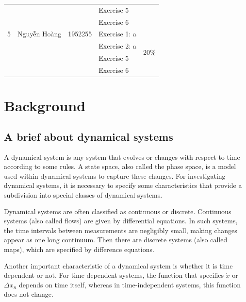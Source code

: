 \documentclass[a4paper]{article}
\numberwithin{equation}{section}
\begin{document}
\begin{center}
\begin{tabular}{llclc}
                 &                       &                     & Exercise 5        &                             \\
                 &                       &                     & Exercise 6        &                             \\
    \midrule
    5            & Nguyễn Hoàng          & 1952255             & Exercise 1: a     & \multirow{4}{*}{20\%}       \\
                 &                       &                     & Exercise 2: a     &                             \\
                 &                       &                     & Exercise 5        &                             \\
                 &                       &                     & Exercise 6        &                             \\
    \bottomrule
  \end{tabular}
\end{center}


\newpage
\section{Background}
\subsection{A brief about dynamical systems}
A dynamical system is any system that evolves or changes with respect to time according to some rules.
A state space, also called the phase space, is a model used within dynamical systems to capture these changes.
For investigating dynamical systems, it is necessary to specify some characteristics that provide a subdivision into special classes of dynamical systems.

Dynamical systems are often classified as continuous or discrete.
Continuous systems (also called flows) are given by differential equations.
In such systems, the time intervals between measurements are negligibly small, making changes appear as one long continuum.
Then there are discrete systems (also called maps), which are specified by difference equations.

Another important characteristic of a dynamical system is whether it is time dependent or not.
For time-dependent systems, the function that specifies \(\dot{x}\) or \(\Delta{x_n}\) depends on time itself, whereas in time-independent systems, this function does not change.
\end{document}
